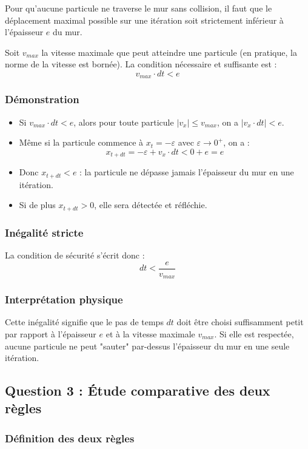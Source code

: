 \documentclass[12pt,a4paper]{report}
\begin{document}
Pour qu'aucune particule ne traverse le mur sans collision, il faut que le déplacement maximal possible sur une itération soit strictement inférieur à l'épaisseur $e$ du mur.

Soit $v_{max}$ la vitesse maximale que peut atteindre une particule (en pratique, la norme de la vitesse est bornée). La condition nécessaire et suffisante est :
\[
v_{max} \cdot dt < e
\]

\subsubsection{Démonstration}

\begin{itemize}
    \item Si $v_{max} \cdot dt < e$, alors pour toute particule $|v_x| \leq v_{max}$, on a $|v_x \cdot dt| < e$.
    \item Même si la particule commence à $x_t = -\varepsilon$ avec $\varepsilon \to 0^+$, on a :
    \[
    x_{t+dt} = -\varepsilon + v_x \cdot dt < 0 + e = e
    \]
    \item Donc $x_{t+dt} < e$ : la particule ne dépasse jamais l'épaisseur du mur en une itération.
    \item Si de plus $x_{t+dt} > 0$, elle sera détectée et réfléchie.
\end{itemize}

\subsubsection{Inégalité stricte}

La condition de sécurité s'écrit donc :
\[
\boxed{dt < \frac{e}{v_{max}}}
\]

\subsubsection{Interprétation physique}

Cette inégalité signifie que le pas de temps $dt$ doit être choisi suffisamment petit par rapport à l'épaisseur $e$ et à la vitesse maximale $v_{max}$. Si elle est respectée, aucune particule ne peut "sauter" par-dessus l'épaisseur du mur en une seule itération.

\subsection{Question 3 : Étude comparative des deux règles}

\subsubsection{Définition des deux règles}
\end{document}
